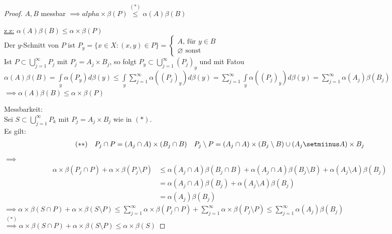   \begin{proof}
	$A,B$ messbar $\implies alpha\times\beta(P)\overset{(\ast)}{\leq}\alpha(A)\beta(B)$\\
	\item[]\underline{z.z:} $\alpha (A) \beta(B) \leq \alpha\times\beta(P)$\\
	Der $y$-Schnitt von $P$ ist $P_y = \{x\in X: (x,y) \in P \} = \begin{cases} A \text{, für } y\in B \\
	\varnothing \text{ sonst } \end{cases}$ \\
	Ist $P \subset \bigcup\limits_{j=1}^\infty P_j$ mit $P_j = A_j\times B_j$, so folgt $P_y \subset \bigcup\limits_{j=1}^\infty (P_j)_y$ und mit Fatou \\ $\alpha(A)\beta(B) = \int\limits_y \alpha(P_y) d\beta(y) \leq \int\limits_y \sum\limits_{j=1}^\infty \alpha((P_j)_y) d\beta(y) = \sum\limits_{j=1}^\infty \int\limits_y \alpha((P_j)_y) d\beta(y) = \sum\limits_{j=1}^\infty \alpha(A_j)\beta(B_j)$ \\
	$\implies \alpha(A)\beta(B) \leq \alpha\times\beta(P)$\\
	\item[]Messbarkeit: \\
	Sei $S\subset\bigcup\limits_{j=1}^\infty P_k$ mit $P_j = A_j\times B_j$ wie in $(\ast)$. \\
	Es gilt: 
	\begin{align*}
		(\ast\ast) && P_j \cap P = (A_j \cap A) \times (B_j \cap B) && P_j\setminus P = (A_j\cap A) \times (B_j\setminus B) \cup (A_j\setmiinus A) \times B_j 
	\end{align*}
	$\implies$ 
	\begin{equation*}
		\begin{split}
		\alpha\times\beta(P_j\cap P) + \alpha\times\beta (P_j\setminus P) &\leq \alpha(A_j \cap A) \beta(B_j\cap B) + \alpha(A_j\cap A)\beta(B_j\setminus B) + \alpha(A_j\setminus A) \beta(B_j) \\
	&= \alpha(A_j\cap A) \beta(B_j) + \alpha(A_j\setminus A)\beta(B_j) \\
	&= \alpha(A_j) \beta(B_j)
	\end{split}
	\end{equation*}
	$\implies \alpha\times\beta(S\cap P) + \alpha\times\beta(S\setminus P) \leq \sum\limits_{j=1}^\infty \alpha\times\beta(P_j\cap P) + \sum\limits_{j=1}^\infty \alpha\times\beta (P_j \setminus P) \leq \sum\limits_{j=1}^\infty \alpha(A_j)\beta(B_j)$\\
	$\overset{(\ast)}{\implies} \alpha\times\beta(S\cap P) + \alpha\times\beta(S\setminus P) \leq \alpha\times\beta(S)$
  \end{proof}

